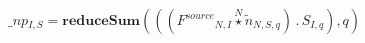 \documentclass[border=2pt]{standalone}
\begin{document}
${\_np}{_{I, S}}=\textbf{reduceSum}\left(\left(\left({{F^{source}}}{_{N, I}} \stackrel{N}{\star} {{\tilde{n}}}{_{N, S, q}}\right) \, . \, {{S}}{_{I, q}}\right),q\right)$
\end{document}
